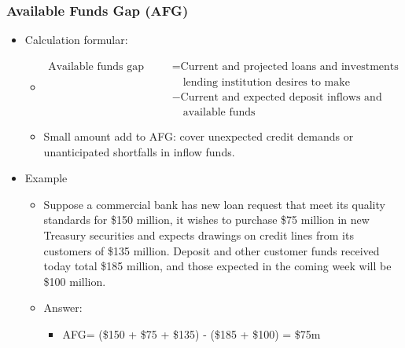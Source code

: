 \subsubsection{Available Funds Gap (AFG)}
\begin{itemize}
\item Calculation formular:
    \begin{itemize}
    \item \begin{align*}
        \text{Available funds gap (AF)}&=\text{Current and projected loans and investments the}\\
        &\quad\text{lending institution desires to make}\\
        &-\text{Current and expected deposit inflows and other}\\
        &\quad\text{available funds}
        \end{align*}
    \item Small amount add to AFG: cover unexpected credit demands or unanticipated shortfalls in inflow funds.
    \end{itemize}
\item Example
    \begin{itemize}
    \item Suppose a commercial bank has new loan request that meet its quality standards for \$150 million, it wishes to purchase \$75 million in new Treasury securities and expects drawings on credit lines from its customers of \$135 million. Deposit and other customer funds received today total \$185 million, and those expected in the coming week will be \$100 million.
    \item Answer:
        \begin{itemize}
        \item AFG= (\$150 + \$75 + \$135) - (\$185 + \$100) = \$75m
        \end{itemize}
    \end{itemize}
\end{itemize}



